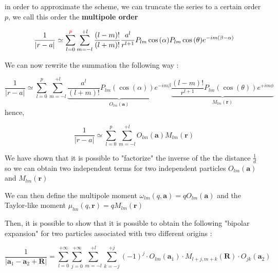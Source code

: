 \documentclass[11pt,twoside,a4paper]{report}
\begin{document}
	in order to approximate the scheme, we can truncate the series to a certain order $p$, we call this order the \textbf{multipole order}
	
	\begin{equation}
	\frac{1}{|r - a|} \simeq \sum\limits_{l=0}^{\textcolor{red}{p}} \sum\limits_{m = -l}^{+l} \frac{(l-m)!}{(l+m)!} \frac{a^l}{r^{l+1}} P_{lm}\cos{(\alpha)}P_{lm}\cos{(\theta)}e^{-im(\beta - \alpha)}
	\end{equation}
	
	We can now rewrite the summation the following way :
	
		\begin{equation}
	\frac{1}{|r - a|} \simeq \sum\limits_{l=0}^{p} \sum\limits_{m = -l}^{+l}
	\underbrace{\frac{a^l}{(l+m)!} P_{lm}(\cos(\alpha))e^{-im\beta}} _{O_{lm}(\textbf{a})}
    \underbrace{\frac{(l-m)!}{r^{l+1}} P_{lm}(\cos(\theta))e^{+im\phi}} _{M_{lm}(\textbf{r})}
	\end{equation}
	hence,
	
		\begin{equation}
	\frac{1}{|r - a|} \simeq \sum\limits_{l=0}^{p} \sum\limits_{m = -l}^{+l}
	{O_{lm}(\textbf{a})}
    {M_{lm}(\textbf{r})}
	\end{equation}
	
	
	We have shown that it is possible to "factorize" the inverse of the the distance $\frac{1}{d}$ so we can obtain two independent terms for two independent particles ${O_{lm}(\textbf{a})}$ and ${M_{lm}(\textbf{r})}$ 


	We can then define the multipole moment $\omega_{lm}(q,\textbf{a}) = q O_{lm}(\textbf{a})$ and the Taylor-like moment $\mu_{lm}(q,\textbf{r}) = q M_{lm}(\textbf{r})$
	
	Then, it is possible to show that it is possible to obtain the following "bipolar expansion" for two particles associated with two different origins :
	
    \begin{equation}
    \frac{1}{|\textbf{a}_1 - \textbf{a}_2 + \textbf{R}|} = 
    \sum\limits_{l=0}^{+\infty}
    \sum\limits_{j=0}^{+\infty}
    \sum\limits_{m=-l}^{+l}
    \sum\limits_{k=-j}^{+j}
    (-1)^j \cdot O_{lm}(\textbf{a}_1) \cdot M_{l+j,m+k}(\textbf{R}) \cdot O_{jk}(\textbf{a}_2)
    \end{equation}
\end{document}
